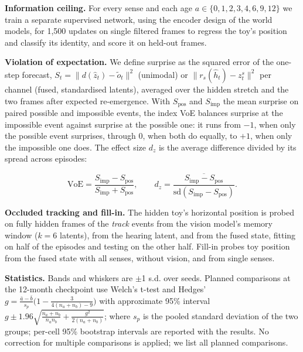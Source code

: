 \documentclass{article}
\begin{document}
\textbf{Information ceiling.} For every sense and each age \(a\in\{0,1,2,3,4,6,9,12\}\) we train a separate supervised network, using the encoder design of the world models, for 1,500 updates on single filtered frames to regress the toy's position and classify its identity, and score it on held-out frames.

\textbf{Violation of expectation.} We define surprise as the squared error of the one-step forecast, \(S_t=\lVert d(\hat z_t)-\tilde o_t\rVert^2\) (unimodal) or \(\lVert r_s(\hat h_t)-z^s_t\rVert^2\) per channel (fused, standardised latents), averaged over the hidden stretch and the two frames after expected re-emergence. With \(S_{\text{pos}}\) and \(S_{\text{imp}}\) the mean surprise on paired possible and impossible events, the index VoE balances surprise at the impossible event against surprise at the possible one: it runs from \(-1\), when only the possible event surprises, through 0, when both do equally, to \(+1\), when only the impossible one does. The effect size \(d_z\) is the average difference divided by its spread across episodes:

\begin{equation}\mathrm{VoE}=\frac{S_{\text{imp}}-S_{\text{pos}}}{S_{\text{imp}}+S_{\text{pos}}},\qquad d_z=\frac{\overline{S_{\text{imp}}-S_{\text{pos}}}}{\mathrm{sd}(S_{\text{imp}}-S_{\text{pos}})}.\end{equation}

\textbf{Occluded tracking and fill-in.} The hidden toy's horizontal position is probed on fully hidden frames of the \emph{track} events from the vision model's memory window (\(k=6\) latents), from the hearing latent, and from the fused state, fitting on half of the episodes and testing on the other half. Fill-in probes toy position from the fused state with all senses, without vision, and from single senses.

\textbf{Statistics.} Bands and whiskers are \ensuremath{\pm}1 s.d. over seeds. Planned comparisons at the 12-month checkpoint use Welch's t-test and Hedges' \(g=\frac{\bar a-\bar b}{s_p}\big(1-\frac{3}{4(n_a+n_b)-9}\big)\) with approximate 95\% interval \(g\pm1.96\sqrt{\frac{n_a+n_b}{n_an_b}+\frac{g^2}{2(n_a+n_b)}}\); where \(s_p\) is the pooled standard deviation of the two groups; per-cell 95\% bootstrap intervals are reported with the results. No correction for multiple comparisons is applied; we list all planned comparisons.
\end{document}
